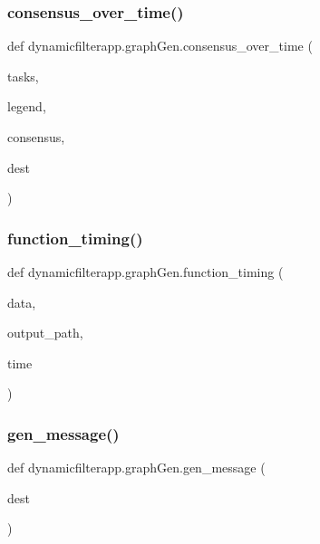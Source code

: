 \subsubsection{\texorpdfstring{consensus\+\_\+over\+\_\+time()}{consensus\_over\_time()}}
{\footnotesize\ttfamily def dynamicfilterapp.\+graph\+Gen.\+consensus\+\_\+over\+\_\+time (\begin{DoxyParamCaption}\item[{}]{tasks,  }\item[{}]{legend,  }\item[{}]{consensus,  }\item[{}]{dest }\end{DoxyParamCaption})}

\mbox{\label{namespacedynamicfilterapp_1_1graph_gen_a829d8f63431b6a26381a167956e0c3a2}} 
\subsubsection{\texorpdfstring{function\+\_\+timing()}{function\_timing()}}
{\footnotesize\ttfamily def dynamicfilterapp.\+graph\+Gen.\+function\+\_\+timing (\begin{DoxyParamCaption}\item[{}]{data,  }\item[{}]{output\+\_\+path,  }\item[{}]{time }\end{DoxyParamCaption})}

\mbox{\label{namespacedynamicfilterapp_1_1graph_gen_a64d150f32e0559d2ca96e9a2db637fd4}} 
\subsubsection{\texorpdfstring{gen\+\_\+message()}{gen\_message()}}
{\footnotesize\ttfamily def dynamicfilterapp.\+graph\+Gen.\+gen\+\_\+message (\begin{DoxyParamCaption}\item[{}]{dest }\end{DoxyParamCaption})}

